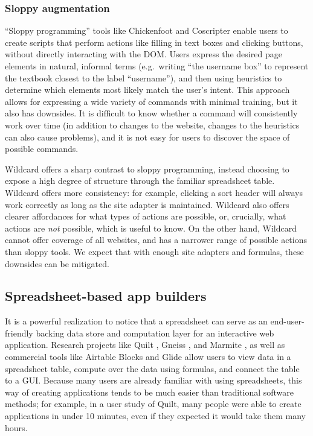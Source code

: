 \documentclass[english,submission]{programming}
\begin{document}
\hypertarget{sloppy-augmentation}{%
\subsubsection{Sloppy augmentation}\label{sloppy-augmentation}}

``Sloppy programming'' \autocite{little2010} tools like Chickenfoot
\autocite{bolin2005} and Coscripter \autocite{leshed2008} enable users
to create scripts that perform actions like filling in text boxes and
clicking buttons, without directly interacting with the DOM. Users
express the desired page elements in natural, informal terms
(e.g.~writing ``the username box'' to represent the textbook closest to
the label ``username''), and then using heuristics to determine which
elements most likely match the user's intent. This approach allows for
expressing a wide variety of commands with minimal training, but it also
has downsides. It is difficult to know whether a command will
consistently work over time (in addition to changes to the website,
changes to the heuristics can also cause problems), and it is not easy
for users to discover the space of possible commands.

Wildcard offers a sharp contrast to sloppy programming, instead choosing
to expose a high degree of structure through the familiar spreadsheet
table. Wildcard offers more consistency: for example, clicking a sort
header will always work correctly as long as the site adapter is
maintained. Wildcard also offers clearer affordances for what types of
actions are possible, or, crucially, what actions are \emph{not}
possible, which is useful to know. On the other hand, Wildcard cannot
offer coverage of all websites, and has a narrower range of possible
actions than sloppy tools. We expect that with enough site adapters and
formulas, these downsides can be mitigated.

\hypertarget{spreadsheet-based-app-builders}{%
\subsection{Spreadsheet-based app
builders}\label{spreadsheet-based-app-builders}}

It is a powerful realization to notice that a spreadsheet can serve as
an end-user-friendly backing data store and computation layer for an
interactive web application. Research projects like Quilt
\autocite{benson2014}, Gneiss \autocite{chang2014}, and Marmite
\autocite{wong2007}, as well as commercial tools like Airtable Blocks
\autocite{zotero-79} and Glide \autocite{zotero-81} allow users to view
data in a spreadsheet table, compute over the data using formulas, and
connect the table to a GUI. Because many users are already familiar with
using spreadsheets, this way of creating applications tends to be much
easier than traditional software methods; for example, in a user study
of Quilt, many people were able to create applications in under 10
minutes, even if they expected it would take them many hours.
\end{document}
